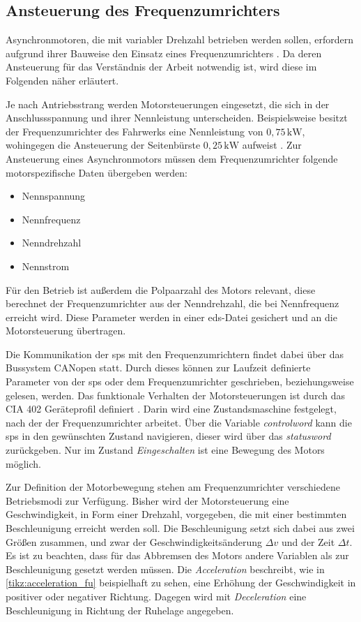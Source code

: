 \subsection{Ansteuerung des Frequenzumrichters}
Asynchronmotoren, die mit variabler Drehzahl betrieben werden sollen, erfordern aufgrund ihrer Bauweise den Einsatz eines Frequenzumrichters \cite{antriebstechnik}. Da deren Ansteuerung für das Verständnis der Arbeit notwendig ist, wird diese im Folgenden näher erläutert.

Je nach Antriebsstrang werden Motorsteuerungen eingesetzt, die sich in der Anschlussspannung und ihrer Nennleistung unterscheiden. Beispielsweise besitzt der Frequenzumrichter des Fahrwerks eine Nennleistung von $0,75\, \text{kW}$, wohingegen die Ansteuerung der  Seitenbürste $0,25\, \text{kW}$ aufweist \cite{schaltplan}. Zur Ansteuerung eines Asynchronmotors müssen dem Frequenzumrichter folgende motorspezifische Daten übergeben werden:
\begin{itemize}[before=\vspace{0.5em},after=\vspace{0.5em}]
	\item Nennspannung
	\item Nennfrequenz
	\item Nenndrehzahl
	\item Nennstrom
\end{itemize}
Für den Betrieb ist außerdem die Polpaarzahl des Motors relevant, diese berechnet der Frequenzumrichter aus der Nenndrehzahl, die bei Nennfrequenz erreicht wird. Diese Parameter werden in einer \ac{eds}-Datei gesichert und an die Motorsteuerung übertragen.

Die Kommunikation der \ac{sps} mit den Frequenzumrichtern findet dabei über das Bussystem CANopen statt. Durch dieses können zur Laufzeit definierte Parameter von der \ac{sps} oder dem Frequenzumrichter geschrieben, beziehungsweise gelesen, werden. Das funktionale Verhalten der Motorsteuerungen ist durch das CIA 402 Geräteprofil definiert \cite{lenze}. Darin wird eine Zustandsmaschine festgelegt, nach der der Frequenzumrichter arbeitet. Über die Variable \textit{controlword} kann die \ac{sps} in den gewünschten Zustand navigieren, dieser wird über das \textit{statusword} zurückgeben. Nur im Zustand \textit{Eingeschalten} ist eine Bewegung des Motors möglich.

Zur Definition der Motorbewegung stehen am Frequenzumrichter verschiedene Betriebsmodi zur Verfügung. Bisher wird der Motorsteuerung eine Geschwindigkeit, in Form einer Drehzahl, vorgegeben, die mit einer bestimmten Beschleunigung erreicht werden soll. 
Die Beschleunigung setzt sich dabei aus zwei Größen zusammen, und zwar der Geschwindigkeitsänderung $\Delta v$ und der Zeit $\Delta t$. Es ist zu beachten, dass für das Abbremsen des Motors andere Variablen als zur Beschleunigung gesetzt werden müssen. Die \textit{Acceleration} beschreibt, wie in \autoref{tikz:acceleration_fu} beispielhaft zu sehen, eine Erhöhung der Geschwindigkeit in positiver oder negativer Richtung. Dagegen wird mit \textit{Deceleration} eine Beschleunigung in Richtung der Ruhelage angegeben. 

